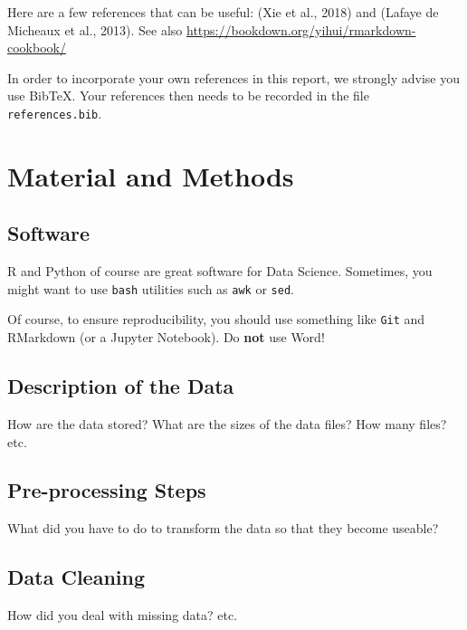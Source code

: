 \documentclass[mstat,12pt]{unswthesis}
\begin{document}
Here are a few references that can be useful: (Xie et al., 2018) and
(Lafaye de Micheaux et al., 2013). See also
\url{https://bookdown.org/yihui/rmarkdown-cookbook/}

\bigskip

In order to incorporate your own references in this report, we strongly
advise you use BibTeX. Your references then needs to be recorded in the
file \texttt{references.bib}.

\hypertarget{material-and-methods}{%
\chapter{Material and Methods}\label{material-and-methods}}

\hypertarget{software}{%
\section{Software}\label{software}}

R and Python of course are great software for Data Science. Sometimes,
you might want to use \texttt{bash} utilities such as \texttt{awk} or
\texttt{sed}.

Of course, to ensure reproducibility, you should use something like
\texttt{Git} and RMarkdown (or a Jupyter Notebook). Do \textbf{not} use
Word!

\hypertarget{description-of-the-data}{%
\section{Description of the Data}\label{description-of-the-data}}

How are the data stored? What are the sizes of the data files? How many
files? etc.

\hypertarget{pre-processing-steps}{%
\section{Pre-processing Steps}\label{pre-processing-steps}}

What did you have to do to transform the data so that they become
useable?

\hypertarget{data-cleaning}{%
\section{Data Cleaning}\label{data-cleaning}}

How did you deal with missing data? etc.
\end{document}
